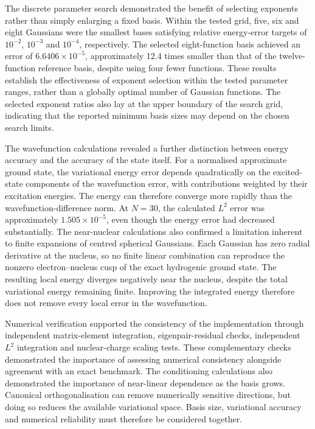The discrete parameter search demonstrated the benefit of selecting exponents rather than simply enlarging a fixed basis. Within the tested grid, five, six and eight Gaussians were the smallest bases satisfying relative energy-error targets of $10^{-2}$, $10^{-3}$ and $10^{-4}$, respectively. The selected eight-function basis achieved an error of $6.6406\times10^{-5}$, approximately 12.4 times smaller than that of the twelve-function reference basis, despite using four fewer functions. These results establish the effectiveness of exponent selection within the tested parameter ranges, rather than a globally optimal number of Gaussian functions. The selected exponent ratios also lay at the upper boundary of the search grid, indicating that the reported minimum basis sizes may depend on the chosen search limits.

The wavefunction calculations revealed a further distinction between energy accuracy and the accuracy of the state itself. For a normalised approximate ground state, the variational energy error depends quadratically on the excited-state components of the wavefunction error, with contributions weighted by their excitation energies. The energy can therefore converge more rapidly than the wavefunction-difference norm. At $N=30$, the calculated $L^2$ error was approximately $1.505\times10^{-5}$, even though the energy error had decreased substantially. The near-nuclear calculations also confirmed a limitation inherent to finite expansions of centred spherical Gaussians. Each Gaussian has zero radial derivative at the nucleus, so no finite linear combination can reproduce the nonzero electron--nucleus cusp of the exact hydrogenic ground state. The resulting local energy diverges negatively near the nucleus, despite the total variational energy remaining finite. Improving the integrated energy therefore does not remove every local error in the wavefunction.

Numerical verification supported the consistency of the implementation through independent matrix-element integration, eigenpair-residual checks, independent $L^2$ integration and nuclear-charge scaling tests. These complementary checks demonstrated the importance of assessing numerical consistency alongside agreement with an exact benchmark. The conditioning calculations also demonstrated the importance of near-linear dependence as the basis grows. Canonical orthogonalisation can remove numerically sensitive directions, but doing so reduces the available variational space. Basis size, variational accuracy and numerical reliability must therefore be considered together.

